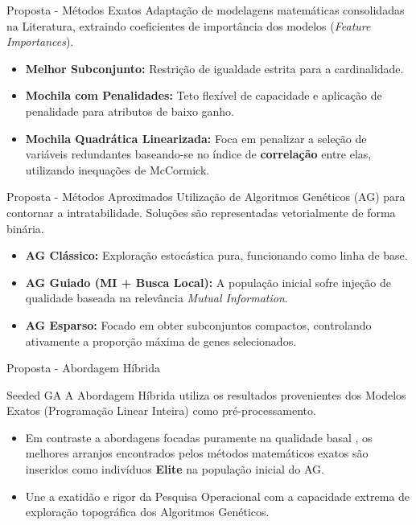 \documentclass [aspectratio=169]{beamer}
\begin{document}
\begin{frame}{Proposta - Métodos Exatos}
Adaptação de modelagens matemáticas consolidadas na Literatura, extraindo coeficientes de importância dos modelos (\textit{Feature Importances}).

\begin{itemize}
    \item \textbf{Melhor Subconjunto:} Restrição de igualdade estrita para a cardinalidade.
    \item \textbf{Mochila com Penalidades:} Teto flexível de capacidade e aplicação de penalidade para atributos de baixo ganho.
    \item \textbf{Mochila Quadrática Linearizada:} Foca em penalizar a seleção de variáveis redundantes baseando-se no índice de \textbf{correlação} entre elas, utilizando inequações de McCormick.
\end{itemize}
\end{frame}

\begin{frame}{Proposta - Métodos Aproximados}
Utilização de Algoritmos Genéticos (AG) para contornar a intratabilidade. Soluções são representadas vetorialmente de forma binária.

\begin{itemize}
    \item \textbf{AG Clássico:} Exploração estocástica pura, funcionando como linha de base.
    \item \textbf{AG Guiado (MI + Busca Local):} A população inicial sofre injeção de qualidade baseada na relevância \textit{Mutual Information}.
    \item \textbf{AG Esparso:} Focado em obter subconjuntos compactos, controlando ativamente a proporção máxima de genes selecionados.
\end{itemize}
\end{frame}

\begin{frame}{Proposta - Abordagem Híbrida}
\begin{block}{Seeded GA}
A Abordagem Híbrida utiliza os resultados provenientes dos Modelos Exatos (Programação Linear Inteira) como pré-processamento.
\end{block}

\vspace{0.3cm}
\begin{itemize}
    \item Em contraste a abordagens focadas puramente na qualidade basal \cite{nayak2022ontological}, os melhores arranjos encontrados pelos métodos matemáticos exatos são inseridos como indivíduos \textbf{Elite} na população inicial do AG.
    \item Une a exatidão e rigor da Pesquisa Operacional com a capacidade extrema de exploração topográfica dos Algoritmos Genéticos.
\end{itemize}
\end{frame}
\end{document}
